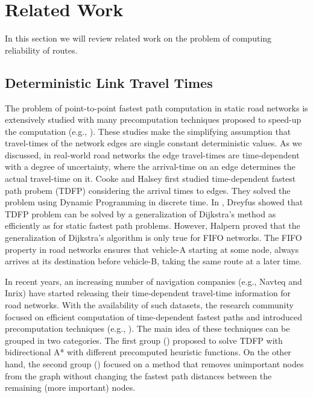 \section{Related Work}
\label{sec:related}
In this section we will review related work on the problem of computing reliability of routes.

\subsection{Deterministic Link Travel Times}
The problem of point-to-point fastest path computation in static road networks
is extensively studied with many precomputation techniques proposed to speed-up
the computation (e.g., \cite{sametcontainer,goldberg05}). These studies
make the simplifying assumption that travel-times of the network edges are single constant deterministic values. As we discussed, in real-world road networks the edge travel-times are time-dependent with a degree of uncertainty, where the arrival-time on an edge determines the
actual travel-time on it. Cooke and Halsey \cite{cooke66tdsp} first studied time-dependent fastest
path probem (TDFP) considering the arrival times to edges. They solved the
problem using Dynamic Programming in discrete time. In \cite{dreyfus69}, Dreyfus
showed that TDFP problem can be solved by a generalization of Dijkstra's method as efficiently as for static fastest path problems.
However, Halpern \cite{halpren77} proved that the generalization of Dijkstra's algorithm is only true for FIFO networks. The FIFO property in road networks ensures that
vehicle-A starting at some node, always arrives at its destination before
vehicle-B, taking the same route at a later time.

In recent years, an increasing number of navigation companies (e.g., Navteq and
Inrix) have started releasing their time-dependent travel-time information for
road networks. With the availability of such datasets, the research community focused on
efficient computation of time-dependent fastest paths and introduced
precomputation techniques (e.g., \cite{Nannicini,timedependentsharc,
timedependentcontraction,DemiryurekSSD11}). The main idea of these
techniques can be grouped in two categories. The first group 
(\cite{Nannicini,DemiryurekSSD11}) proposed  to solve
TDFP with bidirectional A* with different precomputed heuristic functions. On
the other hand, the second group
(\cite{timedependentcontraction,timedependentsharc})  focused on a method that
removes unimportant nodes from the graph without changing the fastest path distances between the remaining (more important) nodes.

